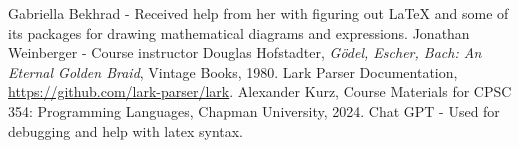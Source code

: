 \documentclass{article}
\theoremstyle{theorem}
\theoremstyle{definition}
\theoremstyle{remark}
\begin{document}
\begin{thebibliography}{99}
 Gabriella Bekhrad - Received help from her with figuring out LaTeX and some of its packages for drawing mathematical diagrams and expressions.
 Jonathan Weinberger - Course instructor
 Douglas Hofstadter, \emph{Gödel, Escher, Bach: An Eternal Golden Braid}, Vintage Books, 1980.
 Lark Parser Documentation, \href{https://github.com/lark-parser/lark}{https://github.com/lark-parser/lark}.
 Alexander Kurz, Course Materials for CPSC 354: Programming Languages, Chapman University, 2024.
 Chat GPT - Used for debugging and help with latex syntax.
\end{thebibliography}
\end{document}
